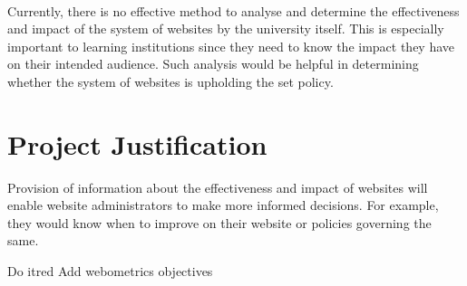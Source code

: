 \paragraph{}
Currently, there is no effective method to analyse and determine the effectiveness and impact of the system of websites by the university itself. This is especially important to learning institutions since they need to know the impact they have on their intended audience.  Such analysis would be helpful in determining whether the system of websites is upholding the set policy.


\section{Project Justification}
Provision of information about the effectiveness and impact of websites will enable website administrators to make more informed decisions. For example, they would know when to improve on their website or policies governing the same.
\begin{review_comment}{Do it}{red}
{Add webometrics objectives}
\end{review_comment}


